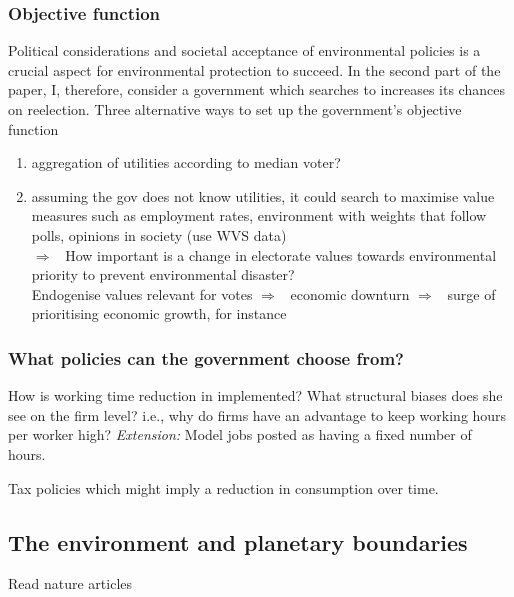 \documentclass[12pt]{article}
\newcommand{\ar}{$\Rightarrow$ \ }
\begin{document}
\subsubsection{Objective function}
Political considerations and societal acceptance of environmental policies is a crucial aspect for environmental protection to succeed. 
In the second part of the paper, I, therefore, consider a government which searches to increases its chances on reelection. 
Three alternative ways to set up the government's objective function
\begin{enumerate}
	\item aggregation of utilities according to median voter?
	\item assuming the gov does not know utilities, it could search to maximise value measures such as employment rates, environment with weights that follow polls, opinions in society (use WVS data)\\ \ar How important is a change in electorate values towards environmental priority to prevent environmental disaster?\\
	Endogenise values relevant for votes \ar economic downturn \ar surge of prioritising economic growth, for instance
\end{enumerate}

\subsubsection{What policies can the government choose from?}
How is working time reduction in \cite{Schor2005SustainableReduction} implemented?
What structural biases does she see on the firm level? i.e., why do firms have an advantage to keep working hours per worker high?
\textit{Extension:} Model jobs posted as having a fixed number of hours.

Tax policies which might imply a reduction in consumption over time.

\subsection{The environment and planetary boundaries}

Read nature articles

\clearpage

\end{document}
